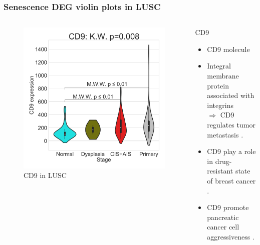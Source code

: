 \documentclass{beamer}
\begin{document}
                \begin{frame}[allowframebreaks]
                    \frametitle{Senescence DEG violin plots in LUSC}

                    \begin{columns}
                        \begin{column}{0.4 \textwidth}
                            \begin{figure}
                                \includegraphics[width=\linewidth]{figures/DEG/Violin/STAR.TPM.SQC.senescence/CD9.pdf}
                                \caption{CD9 in LUSC}
                            \end{figure}
                        \end{column}
                        \begin{column}{0.55 \textwidth}
                            \begin{block}{CD9}
                                \begin{itemize}
                                    \item CD9 molecule
                                    \item Integral membrane protein associated with integrins \\
                                        $\Rightarrow$ CD9 regulates tumor metastasis \cite{CD9-01, CD9-02}.
                                    \item CD9 play a role in drug-resistant state of breast cancer \cite{CD9-03}.
                                    \item CD9 promote pancreatic cancer cell aggressiveness \cite{CD9-04}.
                                \end{itemize}
                            \end{block}
                        \end{column}
                    \end{columns}


\end{frame}
\end{document}

